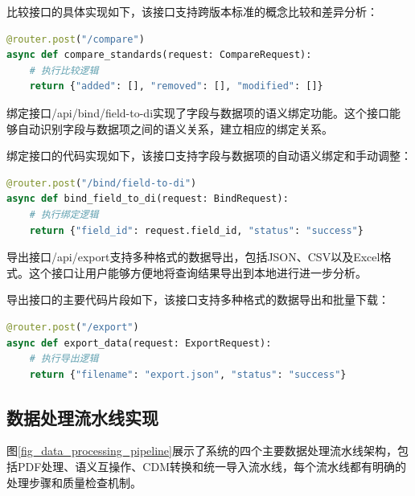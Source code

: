 比较接口的具体实现如下，该接口支持跨版本标准的概念比较和差异分析：

\begin{lstlisting}[language=Python, label=fig:compare_api]
@router.post("/compare")
async def compare_standards(request: CompareRequest):
    # 执行比较逻辑
    return {"added": [], "removed": [], "modified": []}
\end{lstlisting}

绑定接口/api/bind/field-to-di实现了字段与数据项的语义绑定功能。这个接口能够自动识别字段与数据项之间的语义关系，建立相应的绑定关系。

绑定接口的代码实现如下，该接口支持字段与数据项的自动语义绑定和手动调整：

\begin{lstlisting}[language=Python, label=fig:bind_api]
@router.post("/bind/field-to-di")
async def bind_field_to_di(request: BindRequest):
    # 执行绑定逻辑
    return {"field_id": request.field_id, "status": "success"}
\end{lstlisting}

导出接口/api/export支持多种格式的数据导出，包括JSON、CSV以及Excel格式。这个接口让用户能够方便地将查询结果导出到本地进行进一步分析。

导出接口的主要代码片段如下，该接口支持多种格式的数据导出和批量下载：

\begin{lstlisting}[language=Python, label=fig:export_api]
@router.post("/export")
async def export_data(request: ExportRequest):
    # 执行导出逻辑
    return {"filename": "export.json", "status": "success"}
\end{lstlisting}

\subsection{数据处理流水线实现}

图\ref{fig_data_processing_pipeline}展示了系统的四个主要数据处理流水线架构，包括PDF处理、语义互操作、CDM转换和统一导入流水线，每个流水线都有明确的处理步骤和质量检查机制。

